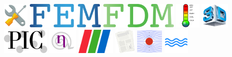 \includegraphics[height=1.25cm]{images/pictograms/tools}
\includegraphics[height=1.25cm]{images/pictograms/FEM}
\includegraphics[height=1.25cm]{images/pictograms/FDM}
\includegraphics[height=1.25cm]{images/pictograms/temperature}
\includegraphics[height=1.25cm]{images/pictograms/3d}
\includegraphics[height=1.25cm]{images/pictograms/pic}
\includegraphics[height=1.25cm]{images/pictograms/nonlinear}
\includegraphics[height=1.25cm]{images/pictograms/paraview}
\includegraphics[height=1.25cm]{images/pictograms/publication}
\includegraphics[height=1.25cm]{images/pictograms/streamfunction}
\includegraphics[height=1.25cm]{images/pictograms/wave}

